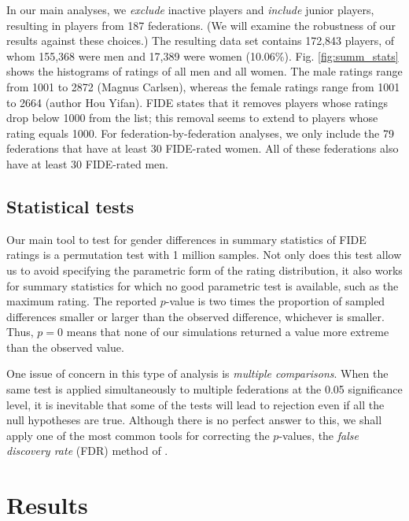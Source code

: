 \documentclass[9pt,twocolumn,twoside,lineno]{pnas-new}
\begin{document}
In our main analyses, we {\it exclude} inactive players and {\it include} junior players, resulting in players from 187 federations. (We will examine the robustness of our results against these choices.) The resulting data set contains 172,843 players, of whom 155,368 were men and 17,389 were women (10.06\%). Fig. \ref{fig:summ_stats} shows the histograms of ratings of all men and all women. The male ratings range from 1001 to 2872 (Magnus Carlsen), whereas the female ratings range from 1001 to 2664 (author Hou Yifan). FIDE states that it removes players whose ratings drop below 1000 from the list; this removal seems to extend to players whose rating equals 1000.  For federation-by-federation analyses, we only include the 79  federations that have at least 30 FIDE-rated women. All of these federations also have at least 30 FIDE-rated men.





\subsection*{Statistical tests}
Our main tool to test for gender differences in summary statistics of FIDE ratings is a permutation test with 1 million samples. Not only does this test allow us to avoid specifying the parametric form of the rating distribution, it also works for summary statistics for which no good parametric test is available, such as the maximum rating. The reported $p$-value is two times the proportion of sampled differences smaller or larger than the observed difference, whichever is smaller. Thus, $p=0$ means that none of our simulations returned a value more extreme than the observed value.

One issue of concern in this type of analysis is \textit{multiple comparisons}. When the same test is applied simultaneously to multiple federations at the 0.05 significance level, it is inevitable that some of the tests will lead to rejection even if all the null hypotheses are true. Although there is no perfect answer to this, we shall apply one of the most common tools for correcting the $p$-values, the \textit{false discovery rate} (FDR) method of \cite{BH95}.

\section*{Results}
\end{document}
